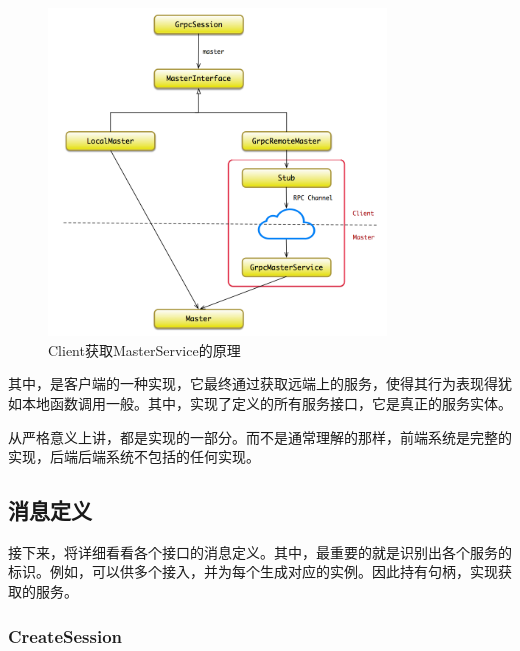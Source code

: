 \begin{content}
\begin{figure}[H]
\centering
\includegraphics[width=0.8\textwidth]{figures/dist-client-master-interaction.png}
\caption{Client获取MasterService的原理}
 \label{fig:dist-client-master-interaction}
\end{figure}

其中，是客户端的一种实现，它最终通过获取远端上的服务，使得其行为表现得犹如本地函数调用一般。其中，实现了定义的所有服务接口，它是真正的服务实体。

\begin{remark}
从严格意义上讲，都是实现的一部分。而不是通常理解的那样，前端系统是完整的实现，后端后端系统不包括的任何实现。
\end{remark}

\subsection{消息定义}

接下来，将详细看看各个接口的消息定义。其中，最重要的就是识别出各个服务的标识。例如，可以供多个接入，并为每个生成对应的实例。因此持有句柄，实现获取的服务。

\subsubsection{CreateSession}


\end{content}
